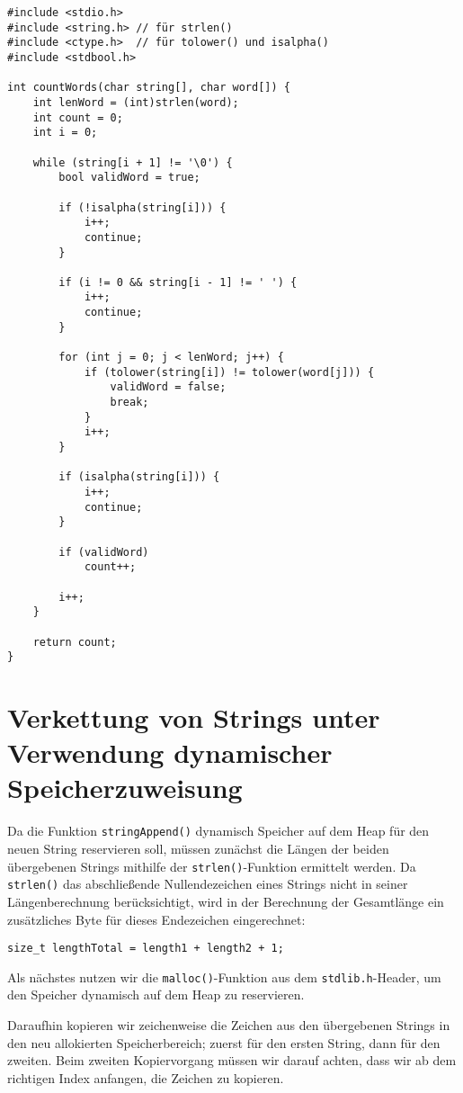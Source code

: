 \begin{verbatim}
#include <stdio.h>
#include <string.h> // für strlen()
#include <ctype.h>  // für tolower() und isalpha()
#include <stdbool.h>

int countWords(char string[], char word[]) {
    int lenWord = (int)strlen(word);
    int count = 0;
    int i = 0;

    while (string[i + 1] != '\0') {
        bool validWord = true;

        if (!isalpha(string[i])) {
            i++;
            continue;
        }

        if (i != 0 && string[i - 1] != ' ') {
            i++;
            continue;
        }

        for (int j = 0; j < lenWord; j++) {
            if (tolower(string[i]) != tolower(word[j])) {
                validWord = false;
                break;
            }
            i++;
        }

        if (isalpha(string[i])) {
            i++;
            continue;
        }

        if (validWord)
            count++;

        i++;
    }

    return count;
}
\end{verbatim}



\chapter{Verkettung von Strings unter Verwendung dynamischer Speicherzuweisung}

Da die Funktion \texttt{stringAppend()} dynamisch Speicher auf dem Heap
für den neuen String reservieren soll, müssen zunächst die Längen der beiden
übergebenen Strings mithilfe der \texttt{strlen()}-Funktion ermittelt
werden. Da \texttt{strlen()} das abschließende Nullendezeichen eines
Strings nicht in seiner Längenberechnung berücksichtigt, wird in der Berechnung
der Gesamtlänge ein zusätzliches Byte für dieses Endezeichen eingerechnet:

\texttt{size_t lengthTotal = length1 + length2 + 1;}

Als nächstes nutzen wir die \texttt{malloc()}-Funktion aus dem
\texttt{stdlib.h}-Header, um den Speicher dynamisch auf dem Heap zu
reservieren.

Daraufhin kopieren wir zeichenweise die Zeichen aus den übergebenen Strings in
den neu allokierten Speicherbereich; zuerst für den ersten String, dann für den
zweiten. Beim zweiten Kopiervorgang müssen wir darauf achten, dass wir ab dem
richtigen Index anfangen, die Zeichen zu kopieren.

